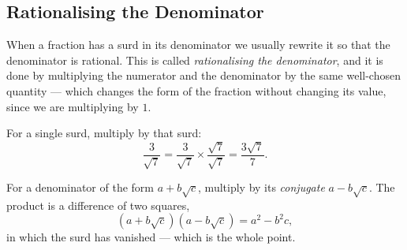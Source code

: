 \documentclass[11pt,a4paper]{article}
\theoremstyle{definition}
\begin{document}
\subsection{Rationalising the Denominator}
When a fraction has a surd in its denominator we usually rewrite it so that the
denominator is rational. This is called \emph{rationalising the denominator}, and
it is done by multiplying the numerator and the denominator by the same
well-chosen quantity --- which changes the form of the fraction without changing its
value, since we are multiplying by $1$.

For a single surd, multiply by that surd:
$$\frac{3}{\sqrt{7}}=\frac{3}{\sqrt{7}}\times\frac{\sqrt{7}}{\sqrt{7}}
=\frac{3\sqrt{7}}{7}.$$

For a denominator of the form $a+b\sqrt{c}$, multiply by its \emph{conjugate}
$a-b\sqrt{c}$. The product is a difference of two squares,
$$\left(a+b\sqrt{c}\right)\left(a-b\sqrt{c}\right)=a^{2}-b^{2}c,$$
in which the surd has vanished --- which is the whole point.
\end{document}
